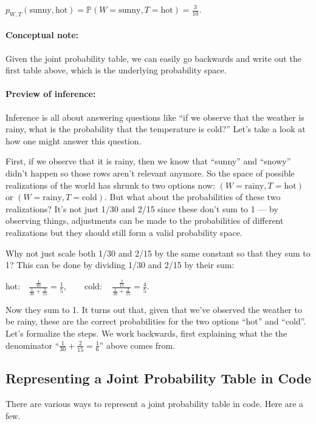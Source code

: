 \documentclass[6008notes.tex]{subfiles}
\begin{document}
$p_{W,T}(\text {sunny},\text {hot})=\mathbb {P}(W=\text {sunny},T=\text {hot})=\frac{3}{10}.$
 
\paragraph{Conceptual note:} Given the joint probability table, we can easily go backwards and write out the first table above, which is the underlying probability space.

\paragraph{Preview of inference:} Inference is all about answering questions like ``if we observe that the weather is rainy, what is the probability that the temperature is cold?'' Let's take a look at how one might answer this question.

First, if we observe that it is rainy, then we know that ``sunny'' and ``snowy'' didn't happen so those rows aren't relevant anymore. So the space of possible realizations of the world has shrunk to two options now: $(W=\text {rainy},T=\text {hot})$ or $(W=\text {rainy},T=\text {cold})$. But what about the probabilities of these two realizations? It's not just 1/30 and 2/15 since these don't sum to 1 --- by observing things, adjustments can be made to the probabilities of different realizations but they should still form a valid probability space.

Why not just scale both 1/30 and 2/15 by the same constant so that they sum to 1? This can be done by dividing 1/30 and 2/15 by their sum:

$\text {hot:}\quad \frac{\frac{1}{30}}{\frac{1}{30}+\frac{2}{15}}=\frac{1}{5},\qquad 
 \text {cold}:\quad \frac{\frac{2}{15}}{\frac{1}{30}+\frac{2}{15}}=\frac{4}{5}.$
 
Now they sum to 1. It turns out that, given that we've observed the weather to be rainy, these are the correct probabilities for the two options ``hot'' and ``cold''. Let's formalize the steps. We work backwards, first explaining what the the denominator ``$\frac{1}{30}+\frac{2}{15}=\frac{1}{6}$'' above comes from.

\subsection{Representing a Joint Probability Table in Code}

There are various ways to represent a joint probability table in code. Here are a few.
\end{document}
